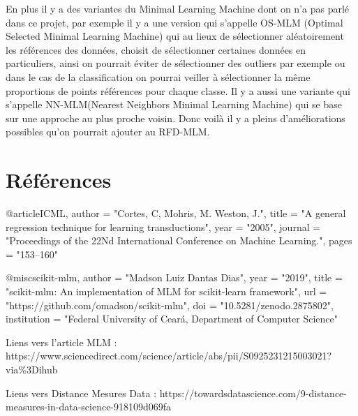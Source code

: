 \documentclass[12pt,a4paper]{report}
\begin{document}
\par En plus il y a des variantes du Minimal Learning Machine dont on n'a pas parlé dans ce projet, par exemple il y a une version qui s'appelle OS-MLM (Optimal Selected Minimal Learning Machine) qui au lieux de sélectionner aléatoirement les références des données, choisit de sélectionner certaines données en particuliers, ainsi on pourrait éviter de sélectionner des outliers par exemple ou dans le cas de la classification on pourrai veiller  à sélectionner la même proportions de points références pour chaque classe. Il y a aussi une variante qui s'appelle NN-MLM(Nearest Neighbors Minimal Learning Machine) qui se base sur une approche au plus proche voisin. Donc voilà il y a pleins d'améliorations possibles qu'on pourrait ajouter au RFD-MLM.


{\color{MidnightBlue}\chapter*{Références}}
\par @article{ICML,
    author  = "Cortes, C, Mohris, M. Weston, J.",
    title   = "A general regression technique for
learning transductions",
    year    = "2005",
    journal = "Proceedings of the 22Nd International Conference on Machine Learning.",
    pages   = "153--160"
}
\par @misc{scikit-mlm,
    author       = "Madson Luiz Dantas Dias",
    year         = "2019",
    title        = "scikit-mlm: An implementation of {MLM} for scikit-learn framework",
    url          = "https://github.com/omadson/scikit-mlm",
    doi          = "10.5281/zenodo.2875802",
    institution  = "Federal University of Cear\'{a}, Department of Computer Science" 
}

\par Liens vers l'article MLM : https://www.sciencedirect.com/science/article/abs/pii/S0925231215003021?via\%3Dihub

\par Liens vers Distance Mesures Data : https://towardsdatascience.com/9-distance-measures-in-data-science-918109d069fa
\end{document}
